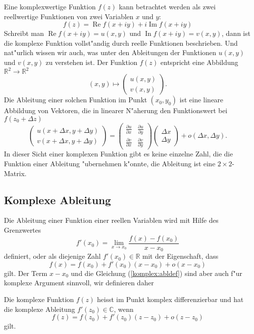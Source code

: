 Eine komplexwertige Funktion $f(z)$ kann betrachtet werden als zwei
reellwertige Funktionen von zwei Variablen $x$ und $y$:
\[
f(z)=\operatorname{Re}f(x+iy) + i \operatorname{Im}f(x+iy)
\]
Schreibt man
$\operatorname{Re}f(x+iy)=u(x,y)$
und
$\operatorname{In}f(x+iy)=v(x,y)$,
dann ist die komplexe Funktion vollst"andig durch reelle Funktionen
beschrieben.
Und nat"urlich wissen wir auch, was unter den Ableitungen der Funktionen 
$u(x,y)$ und $v(x,y)$ zu verstehen ist.
Der Funktion $f(z)$ entspricht eine Abbildung $\mathbb R^2\to\mathbb R^2$
\[
(x,y)\mapsto\begin{pmatrix}u(x,y)\\v(x,y)\end{pmatrix}.
\]
Die Ableitung einer solchen Funktion im Punkt $(x_0,y_0)$
ist eine lineare Abbildung von Vektoren, die in linearer N"aherung
den Funktionswert bei $f(z_0 + \Delta z)$ 
\[
\begin{pmatrix}
u(x+\Delta x, y +\Delta y)\\
v(x+\Delta x, y +\Delta y)
\end{pmatrix}
=
\begin{pmatrix}
\frac{\partial u}{\partial x}&\frac{\partial u}{\partial y}\\
\frac{\partial v}{\partial x}&\frac{\partial v}{\partial y}
\end{pmatrix}
\begin{pmatrix} \Delta x\\\Delta y \end{pmatrix}
+o(\Delta x, \Delta y).
\]
In dieser Sicht einer komplexen Funktion gibt es keine einzelne Zahl, die
die Funktion einer Ableitung "ubernehmen k"onnte, die Ableitung
ist eine $2\times 2$-Matrix.

\subsection{Komplexe Ableitung}
Die Ableitung einer Funktion einer reellen Variablen wird mit Hilfe des
Grenzwertes
\[
f'(x_0)=\lim_{x\to x_0}\frac{f(x)-f(x_0)}{x-x_0}
\]
definiert, oder als diejenige Zahl $f'(x_0)\in\mathbb R$ mit der Eigenschaft,
dass
\begin{equation}
f(x)=f(x_0)+f'(x_0)(x-x_0) + o(x-x_0)
\label{komplex:abldef}
\end{equation}
gilt.
Der Term $x-x_0$ und die Gleichung (\ref{komplex:abldef}) sind aber auch
f"ur komplexe Argument sinnvoll, wir definieren daher

\begin{definition}
Die komplexe Funktion $f(z)$ heisst im Punkt komplex differenzierbar
und hat die komplexe Ableitung $f'(z_0)\in\mathbb C$,
wenn 
\begin{equation}
f(z)=f(z_0) + f'(z_0)(z-z_0) +o(z-z_0)
\label{komplex:defkomplabl}
\end{equation}
gilt.
\end{definition}

